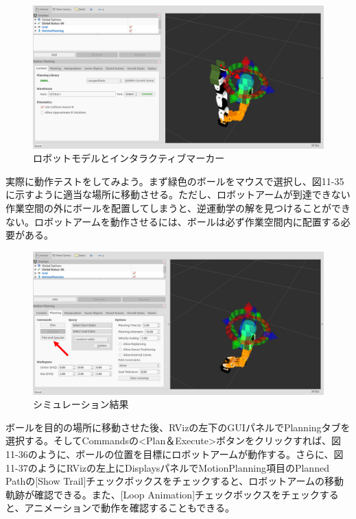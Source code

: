 \begin{figure}[ht]
  \centering
  \includegraphics[width=\columnwidth]{pictures/chapter11/pic_11_34.png}
  \caption{ロボットモデルとインタラクティブマーカー}
\end{figure}

実際に動作テストをしてみよう。まず緑色のボールをマウスで選択し、図11-35に示すように適当な場所に移動させる。ただし、ロボットアームが到達できない作業空間の外にボールを配置してしまうと、逆運動学の解を見つけることができない。ロボットアームを動作させるには、ボールは必ず作業空間内に配置する必要がある。

\begin{figure}[ht]
  \centering
  \includegraphics[width=\columnwidth]{pictures/chapter11/pic_11_35.png}
  \caption{シミュレーション結果}
\end{figure}

ボールを目的の場所に移動させた後、RVizの左下のGUIパネルでPlanningタブを選択する。そしてCommandsの<Plan＆Execute>ボタンをクリックすれば、図11-36のように、ボールの位置を目標にロボットアームが動作する。さらに、図11-37のようにRVizの左上にDisplaysパネルでMotionPlanning項目のPlanned Pathの[Show Trail]チェックボックスをチェックすると、ロボットアームの移動軌跡が確認できる。また、[Loop Animation]チェックボックスをチェックすると、アニメーションで動作を確認することもできる。

